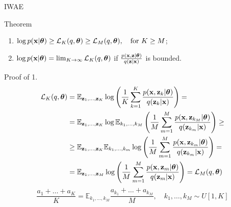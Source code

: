 \begin{frame}{IWAE}
	\begin{block}{Theorem}
		\begin{enumerate}
			\item $\log p(\mathbf{x} | \boldsymbol{\theta}) \geq \mathcal{L}_K (q, \boldsymbol{\theta}) \geq \mathcal{L}_M (q, \boldsymbol{\theta}), \quad \text{for } K \geq M$;
			\item $\log p(\mathbf{x} | \boldsymbol{\theta}) = \lim_{K \rightarrow \infty} \mathcal{L}_K (q, \boldsymbol{\theta})$ if $\frac{p(\mathbf{x}, \mathbf{z} | \boldsymbol{\theta})}{q(\mathbf{z} | \mathbf{x})}$ is bounded.
		\end{enumerate}
		\vspace{-0.2cm}
	\end{block}
	\begin{block}{Proof of 1.}
		{ \footnotesize
			\vspace{-0.6cm}
			\begin{align*}
				\mathcal{L}_K (q, \boldsymbol{\theta}) &= \mathbb{E}_{\mathbf{z}_1, \dots, \mathbf{z}_K} \log \left( \frac{1}{K}\sum_{k=1}^K\frac{p(\mathbf{x}, \mathbf{z}_k | \boldsymbol{\theta})}{q(\mathbf{z}_k| \mathbf{x})} \right) = \\
				&= \mathbb{E}_{\mathbf{z}_1, \dots, \mathbf{z}_K} \log \mathbb{E}_{k_1, \dots, k_M} \left( \frac{1}{M}\sum_{m=1}^M\frac{p(\mathbf{x}, \mathbf{z}_{k_M} | \boldsymbol{\theta})}{q(\mathbf{z}_{k_m}| \mathbf{x})} \right) \geq \\
				&\geq \mathbb{E}_{\mathbf{z}_1, \dots, \mathbf{z}_K} \mathbb{E}_{k_1, \dots, k_m} \log \left( \frac{1}{M}\sum_{m=1}^M\frac{p(\mathbf{x}, \mathbf{z}_{k_m} | \boldsymbol{\theta})}{q(\mathbf{z}_{k_m}| \mathbf{x})} \right) = \\
				&= \mathbb{E}_{\mathbf{z}_1, \dots, \mathbf{z}_M} \log \left( \frac{1}{M}\sum_{m=1}^M\frac{p(\mathbf{x}, \mathbf{z}_m | \boldsymbol{\theta})}{q(\mathbf{z}_m| \mathbf{x})} \right) = \mathcal{L}_M (q, \boldsymbol{\theta})
			\end{align*}
			\[
			\frac{a_1 + \dots + a_K}{K} = \mathbb{E}_{k_1, \dots, k_M} \frac{a_{k_1} + \dots + a_{k_M}}{M}, \quad k_1, \dots, k_M \sim U[1, K]
			\]
		}
	\end{block}
	
\end{frame}
